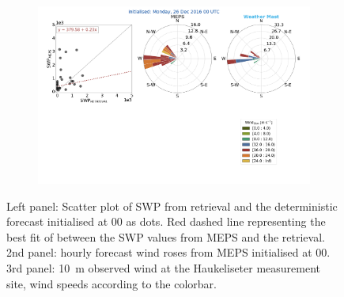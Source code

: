 \begin{figure}
	\newline
	\begin{subfigure}[b]{0.84\textwidth}
		\includegraphics[trim={2.3cm 19.5cm 2.cm .7cm},clip,width=\textwidth]{./fig_windrose/20161226}
		\caption{}\label{fig:wind26}
	\end{subfigure}
	\caption{Left panel: Scatter plot of SWP from retrieval and the deterministic forecast initialised at \SI{00}{\UTC} as dots. Red dashed line representing the best fit of between the SWP values from MEPS and the retrieval. 2nd panel: hourly forecast wind roses from MEPS initialised at \SI{00}{\UTC}. 3rd panel: \SI{10}{\metre} observed wind at the Haukeliseter measurement site, wind speeds according to the colorbar. }\label{fig:SWP_wind}
\end{figure}